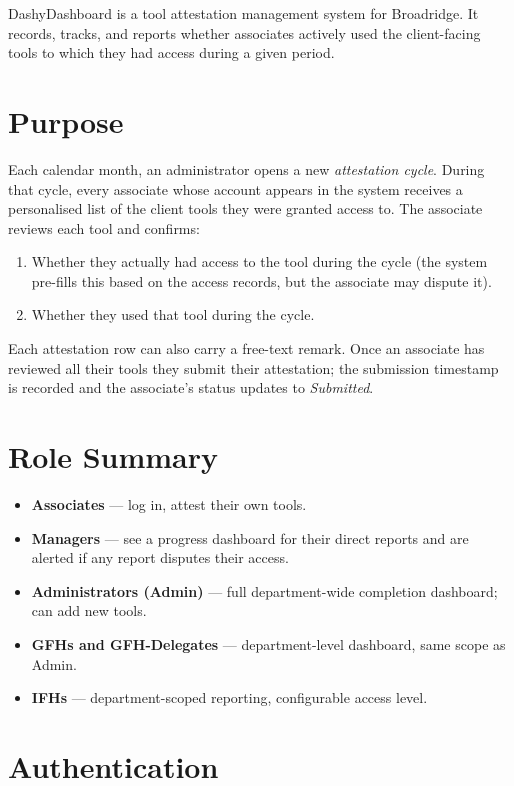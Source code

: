 \documentclass[12pt,a4paper]{report}
\begin{document}
DashyDashboard is a tool attestation management system for Broadridge. It records, tracks, and
reports whether associates actively used the client-facing tools to which they had access during
a given period.

\section{Purpose}

Each calendar month, an administrator opens a new \emph{attestation cycle}. During that cycle,
every associate whose account appears in the system receives a personalised list of the client
tools they were granted access to. The associate reviews each tool and confirms:

\begin{enumerate}
  \item Whether they actually had access to the tool during the cycle (the system pre-fills this
        based on the access records, but the associate may dispute it).
  \item Whether they used that tool during the cycle.
\end{enumerate}

Each attestation row can also carry a free-text remark. Once an associate has reviewed all their
tools they submit their attestation; the submission timestamp is recorded and the associate's
status updates to \emph{Submitted}.

\section{Role Summary}

\begin{itemize}
  \item \textbf{Associates} — log in, attest their own tools.
  \item \textbf{Managers} — see a progress dashboard for their direct reports and are alerted if
        any report disputes their access.
  \item \textbf{Administrators (Admin)} — full department-wide completion dashboard; can add
        new tools.
  \item \textbf{GFHs and GFH-Delegates} — department-level dashboard, same scope as Admin.
  \item \textbf{IFHs} — department-scoped reporting, configurable access level.
\end{itemize}

\section{Authentication}
\end{document}
